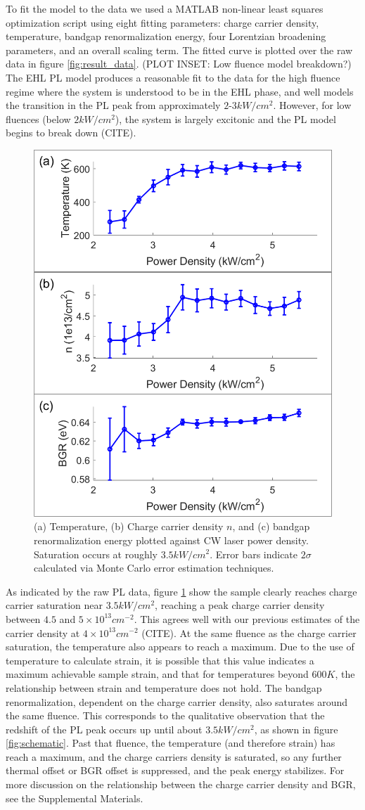\documentclass[aps,prb,preprint,groupedaddress]{revtex4-2}
\begin{document}
To fit the model to the data we used a MATLAB non-linear least squares optimization script using eight fitting parameters: charge carrier density, temperature, bandgap renormalization energy, four Lorentzian broadening parameters, and an overall scaling term. The fitted curve is plotted over the raw data in figure \ref{fig:result_data}. (PLOT INSET: Low fluence model breakdown?) The EHL PL model produces a reasonable fit to the data for the high fluence regime where the system is understood to be in the EHL phase, and well models the transition in the PL peak from approximately $2$-$3kW/cm^2$. However, for low fluences (below $2kW/cm^2$), the system is largely excitonic and the PL model begins to break down (CITE).


\begin{figure}
	\includegraphics[width=0.5\linewidth]{fig_pars.png}
	\caption{(a) Temperature, (b) Charge carrier density $n$, and (c) bandgap renormalization energy plotted against CW laser power density. Saturation occurs at roughly $3.5 kW/cm^2$. Error bars indicate $2\sigma$ calculated via Monte Carlo error estimation techniques.}
	\label{fig:pars}
\end{figure}

As indicated by the raw PL data, figure \ref{fig:pars} show the sample clearly reaches charge carrier saturation near $3.5 kW/cm^2$, reaching a peak charge carrier density between $4.5$ and $5\times 10^{13}  cm^{-2}$. This agrees well with our previous estimates of the carrier density at $4 \times 10^{13}  cm^{-2}$ (CITE). At the same fluence as the charge carrier saturation, the temperature also appears to reach a maximum. Due to the use of temperature to calculate strain, it is possible that this value indicates a maximum achievable sample strain, and that for temperatures beyond $600 K$, the relationship between strain and temperature does not hold. The bandgap renormalization, dependent on the charge carrier density, also saturates around the same fluence. This corresponds to the qualitative observation that the redshift of the PL peak occurs up until about $3.5 kW/cm^2$, as shown in figure \ref{fig:schematic}. Past that fluence, the temperature (and therefore strain) has reach a maximum, and the charge carriers density is saturated, so any further thermal offset or BGR offset is suppressed, and the peak energy stabilizes. For more discussion on the relationship between the charge carrier density and BGR, see the Supplemental Materials.
\end{document}
